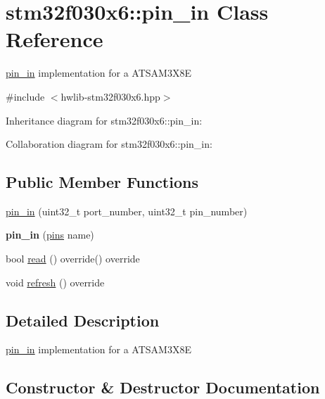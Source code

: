 \hypertarget{classstm32f030x6_1_1pin__in}{}\section{stm32f030x6\+:\+:pin\+\_\+in Class Reference}
\label{classstm32f030x6_1_1pin__in}


\hyperlink{classstm32f030x6_1_1pin__in}{pin\+\_\+in} implementation for a A\+T\+S\+A\+M3\+X8E  




{\ttfamily \#include $<$hwlib-\/stm32f030x6.\+hpp$>$}



Inheritance diagram for stm32f030x6\+:\+:pin\+\_\+in\+:


Collaboration diagram for stm32f030x6\+:\+:pin\+\_\+in\+:
\subsection*{Public Member Functions}
\begin{DoxyCompactItemize}
\item 
\hyperlink{classstm32f030x6_1_1pin__in_ae6c64cb5e31bf1525121bde6f22cce73}{pin\+\_\+in} (uint32\+\_\+t port\+\_\+number, uint32\+\_\+t pin\+\_\+number)
\item 
\mbox{\label{classstm32f030x6_1_1pin__in_a33c9c609037a4154f562859262c68569}} 
{\bfseries pin\+\_\+in} (\hyperlink{namespacestm32f030x6_aec819db41bff19f45418c0d22e5ccecf}{pins} name)
\item 
bool \hyperlink{classstm32f030x6_1_1pin__in_a930e692fe61caf9724c53ac9f0577432}{read} () override() override
\item 
void \hyperlink{classstm32f030x6_1_1pin__in_a8d213fc447b0c7e8acf5f331f1c85683}{refresh} () override
\end{DoxyCompactItemize}


\subsection{Detailed Description}
\hyperlink{classstm32f030x6_1_1pin__in}{pin\+\_\+in} implementation for a A\+T\+S\+A\+M3\+X8E 

\subsection{Constructor \& Destructor Documentation}
\mbox{\label{classstm32f030x6_1_1pin__in_ae6c64cb5e31bf1525121bde6f22cce73}} 
